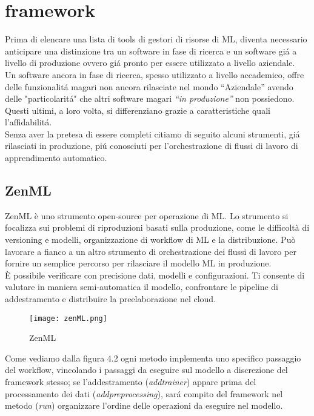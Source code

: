 \documentclass[../tesi.tex]{subfiles}
\begin{document}
\section{\Gls{framework}}
  Prima di elencare una lista di tools di gestori di risorse di ML, diventa necessario anticipare una distinzione tra un software in fase di ricerca e un software giá a livello di produzione ovvero giá pronto per essere utilizzato a livello aziendale.\\
  Un software ancora in fase di ricerca, spesso utilizzato a livello accademico, offre delle funzionalitá magari non ancora rilasciate nel mondo ``Aziendale'' avendo delle "particolaritá" che altri software magari \textit{``in produzione''} non possiedono.\\
  Questi ultimi, a loro volta, si differenziano grazie a caratteristiche quali l'affidabilitá.\\
  Senza aver la pretesa di essere completi citiamo di seguito alcuni strumenti, giá rilasciati in produzione, piú conosciuti per l'orchestrazione di flussi di lavoro di apprendimento automatico.

  \newpage
  \subsection{ZenML} 
  ZenML è uno strumento open-source per operazione di ML.
  Lo strumento si focalizza sui problemi di riproduzioni basati sulla produzione, come le difficoltà di versioning e modelli, organizzazione di workflow di ML e la distribuzione. Può lavorare a fianco a un altro strumento di orchestrazione dei flussi di lavoro per fornire un semplice percorso per rilasciare il modello ML in produzione.\\
  È possibile verificare con precisione dati, modelli e configurazioni. Ti consente di valutare in maniera semi-automatica il modello, confrontare le pipeline di addestramento e distribuire la preelaborazione nel cloud.
  
\begin{figure}[htbp]
\centering
\texttt{[image: zenML.png]} 
\caption{ZenML}
\end{figure}
  Come vediamo dalla figura 4.2 ogni metodo implementa uno specifico passaggio del workflow, vincolando i passaggi da eseguire sul modello a discrezione del \Gls{framework} stesso; se l'addestramento (\textit{add\textunderscore trainer}) appare prima del processamento dei dati (\textit{add\textunderscore preprocessing}), sará compito del framework nel metodo (\textit{run}) organizzare l'ordine delle operazioni da eseguire nel modello.
  
\end{document}
